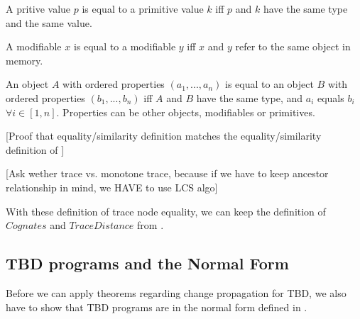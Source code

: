 \begin{definition}
A pritive value $p$ is equal to a primitive value $k$ iff $p$ and $k$ have the same type and the same value. 

A modifiable $x$ is equal to a modifiable $y$ iff $x$ and $y$ refer to the same object in memory.

An object $A$ with ordered properties $(a_1, ..., a_n)$ is equal to an object $B$ with ordered properties  $(b_1, ..., b_n)$ iff $A$ and $B$ have the same type, and $a_i$ equals $b_i$ $\forall i \in[1, n]$. Properties can be other objects, modifiables or primitives. 
\end{definition}

[Proof that equality/similarity definition matches the equality/similarity definition of \cite{Acar2005thesis}]

[Ask wether trace vs. monotone trace, because if we have to keep ancestor relationship in mind, we HAVE to use LCS algo]

With these definition of trace node equality, we can keep the definition of $Cognates$ and $Trace Distance$ from \cite{Acar2005thesis}.  

\subsection{TBD programs and the Normal Form}
Before we can apply theorems regarding change propagation for TBD, we also have to show that TBD programs are in the normal form defined in \cite{Acar2005thesis}.